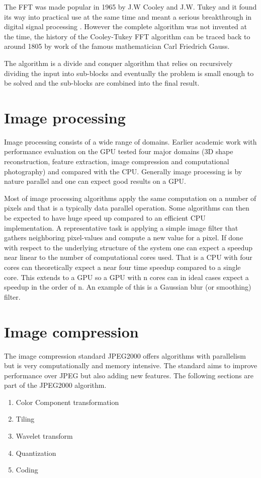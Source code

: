 The FFT was made popular in 1965 by J.W Cooley and J.W. Tukey and it found its way into practical use at the same time and meant a serious breakthrough in digital signal processing \cite{Cooley1969, Brigham1967}. However the complete algorithm was not invented at the time, the history of the Cooley-Tukey FFT algorithm can be traced back to around 1805 by work of the famous mathematician Carl Friedrich Gauss\cite{Heideman1985}.

The algorithm is a divide and conquer algorithm that relies on recursively dividing the input into sub-blocks and eventually the problem is small enough to be solved and the sub-blocks are combined into the final result.
\section{Image processing}
Image processing consists of a wide range of domains. Earlier academic work with performance evaluation on the GPU\cite{Park2011} tested four major domains (3D shape reconstruction, feature extraction, image compression and computational photography) and compared with the CPU. Generally image processing is by nature parallel and one can expect good results on a GPU.

Most of image processing algorithms apply the same computation on a number of pixels and that is a typically data parallel operation. Some algorithms can then be expected to have huge speed up compared to an efficient CPU implementation. A representative task is applying a simple image filter that gathers neighboring pixel-values and compute a new value for a pixel. If done with respect to the underlying structure of the system one can expect a speedup near linear to the number of computational cores used. That is a CPU with four cores can theoretically expect a near four time speedup compared to a single core. This extends to a GPU so a GPU with n cores can in ideal cases expect a speedup in the order of n. An example of this is a Gaussian blur (or smoothing) filter.

\section{Image compression}
The image compression standard JPEG2000 offers algorithms with parallelism but is very computationally and memory intensive. The standard aims to improve performance over JPEG but also adding new features. The following sections are part of the JPEG2000 algorithm\cite{Christopoulos2000}.
\begin{enumerate}
	\item Color Component transformation
	\item Tiling
	\item Wavelet transform
	\item Quantization
	\item Coding
\end{enumerate}

